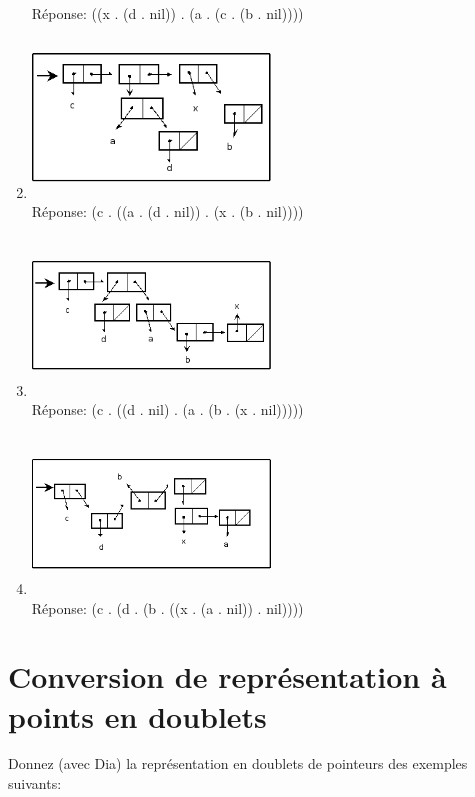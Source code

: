 \documentclass[a4paper, 11pt]{article}
\begin{document}
\begin{enumerate}
Réponse: ((x . (d . nil)) . (a . (c . (b . nil))))
  \item \includegraphics[height=120pt, width=180pt]{Pointeurs_Exo4.png}\\
Réponse: (c . ((a . (d . nil)) . (x . (b . nil))))
  \item \includegraphics[height=120pt, width=180pt]{Pointeurs_Exo5.png}\\
Réponse: (c . ((d . nil) . (a . (b . (x . nil)))))
  \item \includegraphics[height=120pt, width=180pt]{Pointeurs_Exo6.png}\\
Réponse: (c . (d . (b . ((x . (a . nil)) . nil))))
\end{enumerate}

\section{Conversion de représentation à points en doublets}

 Donnez (avec Dia) la représentation en doublets de pointeurs des exemples suivants:\\
\end{document}
